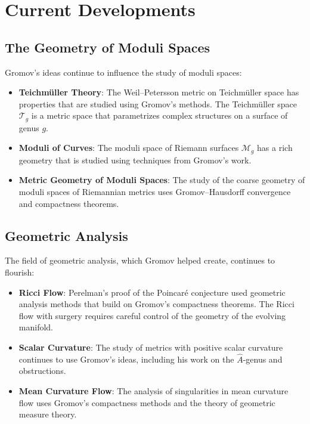 \section{Current Developments}

\subsection{The Geometry of Moduli Spaces}

Gromov's ideas continue to influence the study of moduli spaces:
\begin{itemize}
\item \textbf{Teichm\"uller Theory}: The Weil--Petersson metric on Teichm\"uller space has properties that are studied using Gromov's methods. The Teichm\"uller space $\mathcal{T}_g$ is a metric space that parametrizes complex structures on a surface of genus $g$.
\item \textbf{Moduli of Curves}: The moduli space of Riemann surfaces $\mathcal{M}_g$ has a rich geometry that is studied using techniques from Gromov's work.
\item \textbf{Metric Geometry of Moduli Spaces}: The study of the coarse geometry of moduli spaces of Riemannian metrics uses Gromov--Hausdorff convergence and compactness theorems.
\end{itemize}

\subsection{Geometric Analysis}

The field of geometric analysis, which Gromov helped create, continues to flourish:
\begin{itemize}
\item \textbf{Ricci Flow}: Perelman's proof of the Poincar\'e conjecture used geometric analysis methods that build on Gromov's compactness theorems. The Ricci flow with surgery requires careful control of the geometry of the evolving manifold.
\item \textbf{Scalar Curvature}: The study of metrics with positive scalar curvature continues to use Gromov's ideas, including his work on the $\widehat{A}$-genus and obstructions.
\item \textbf{Mean Curvature Flow}: The analysis of singularities in mean curvature flow uses Gromov's compactness methods and the theory of geometric measure theory.
\end{itemize}

